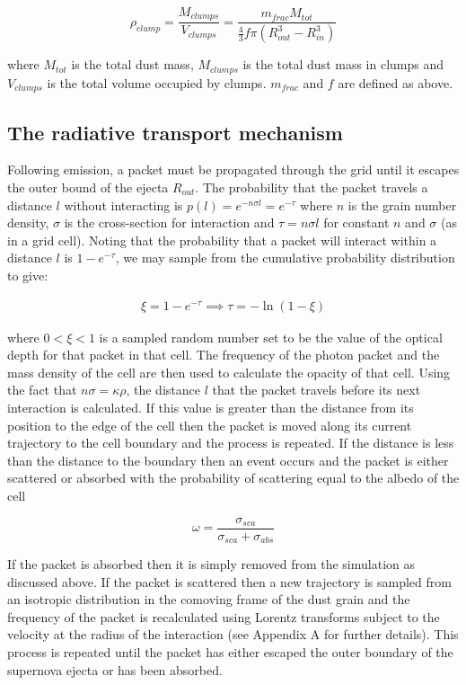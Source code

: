 \documentclass[useAMS,usenatbib,usegraphicx]{mnras}
\begin{document}
\begin{equation}
\rho_{clump}=\frac{M_{clumps}}{V_{clumps}}=\frac{m_{frac}M_{tot}}{\frac{4}{3} f\pi (R_{out}^{3}-R_{in}^{3} )}
\end{equation}

\noindent where $M_{tot}$ is the total dust mass, $M_{clumps}$ is the 
total dust mass in clumps and $V_{clumps}$ is the total volume occupied by 
clumps.  $m_{frac}$ and $f$ are defined as above.


\subsection{The radiative transport mechanism}
\label{transport}

Following emission, a packet must be propagated through the grid until it 
escapes the outer bound of the ejecta $R_{out}$.  The probability that the 
packet travels a distance $l$ without interacting is $p(l)=e ^{-n \sigma 
l}=e ^{-\tau} $ where $n$ is the grain number density, $\sigma$ is the 
cross-section for interaction and $ \tau = n\sigma l$ for constant $n$ and 
$\sigma$ (as in a grid cell).  Noting that the probability that a packet 
will interact within a distance $l$ is $1-e^{-\tau}$, we may 
sample from the cumulative probability distribution to give:

\begin{align}
\xi = 1 - e^{-\tau} \implies \tau= -\ln (1-\xi)
\end{align}

\noindent where $0<\xi<1$ is a sampled random number set to be the value 
of the optical depth for that packet in that cell.  The frequency of the 
photon packet and the mass density of the cell are then used to calculate 
the opacity of that cell. Using the fact that $n\sigma=\kappa\rho$, 
the distance $l$ that the packet travels before its next interaction is 
calculated.  If this value is greater than the distance from its position 
to the edge of the cell then the packet is moved along its current 
trajectory to the cell boundary and the process is repeated.  If the 
distance is less than the distance to the boundary then an event occurs 
and the packet is either scattered or absorbed with the probability of 
scattering equal to the albedo of the cell

\begin{equation}
	\omega=\frac{\sigma_{sca}}{\sigma_{sca}+\sigma_{abs}}
\end{equation}

If the packet is absorbed then it is simply removed from the simulation as 
discussed above.  If the packet is scattered then a new trajectory is 
sampled from an isotropic distribution in the comoving frame of the dust 
grain and the frequency of the packet is recalculated using Lorentz 
transforms subject to the velocity at the radius of the interaction (see 
Appendix A for further details).  This process is repeated until the 
packet has either escaped the outer boundary of the supernova ejecta or has been 
absorbed.
   
\end{document}
